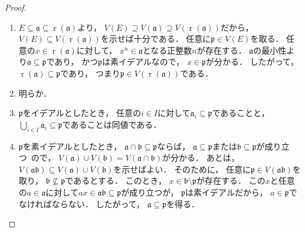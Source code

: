 \documentclass{jlreq}
\DeclareMathOperator{\Radical}{r}
\begin{document}
	\begin{proof}
		\quad
		\begin{enumerate}
			\item $E \subseteq \mathfrak{a} \subseteq \Radical(\mathfrak{a})$より，
			$V(E) \supseteq V(\mathfrak{a}) \supseteq V(\Radical(\mathfrak{a}))$だから，
			$V(E) \subseteq V(\Radical(\mathfrak{a}))$を示せば十分である．
			任意に$\mathfrak{p} \in V(E)$を取る．
			任意の$x \in \Radical(\mathfrak{a})$に対して，
			$x^n \in \mathfrak{a}$となる正整数$n$が存在する．
			$\mathfrak{a}$の最小性より$\mathfrak{a} \subseteq \mathfrak{p}$であり，
			かつ$\mathfrak{p}$は素イデアルなので，
			$x \in \mathfrak{p}$が分かる．
			したがって，
			$\Radical(\mathfrak{a}) \subseteq \mathfrak{p}$であり，
			つまり$\mathfrak{p} \in V(\Radical(\mathfrak{a}))$である．
			\item 明らか．
			\item $\mathfrak{p}$をイデアルとしたとき，
			任意の$i \in I$に対して$\mathfrak{a}_i \subseteq \mathfrak{p}$であることと，
			$\bigcup_{i \in I} \mathfrak{a}_i \subseteq \mathfrak{p}$であることは同値である．
			\item $\mathfrak{p}$を素イデアルとしたとき，
			$\mathfrak{a} \cap \mathfrak{b} \subseteq \mathfrak{p}$ならば，
			$\mathfrak{a} \subseteq \mathfrak{p}$または$\mathfrak{b} \subseteq \mathfrak{p}$が成り立つ~\cite[pp.\,11-12; 命題1.11.ii]{atiyah2006}ので，
			$V(\mathfrak{a}) \cup V(\mathfrak{b}) = V(\mathfrak{a} \cap \mathfrak{b})$が分かる．
			あとは，
			$V(\mathfrak{a} \mathfrak{b}) \subseteq V(\mathfrak{a}) \cup V(\mathfrak{b})$を示せばよい．
			そのために，
			任意に$\mathfrak{p} \in V(\mathfrak{a} \mathfrak{b})$を取り，
			$\mathfrak{b} \not\subseteq \mathfrak{p}$であるとする．
			このとき，
			$x \in \mathfrak{b} \setminus \mathfrak{p}$が存在する．
			この$x$と任意の$a \in \mathfrak{a}$に対して$ax \in \mathfrak{a} \mathfrak{b} \subseteq \mathfrak{p}$が成り立つが，
			$\mathfrak{p}$は素イデアルだから，
			$a \in \mathfrak{p}$でなければならない．
			したがって，
			$\mathfrak{a} \subseteq \mathfrak{p}$を得る．\qedhere
		\end{enumerate}
	\end{proof}
	
	
	\nocite{GAPref}
	
	
\end{document}
